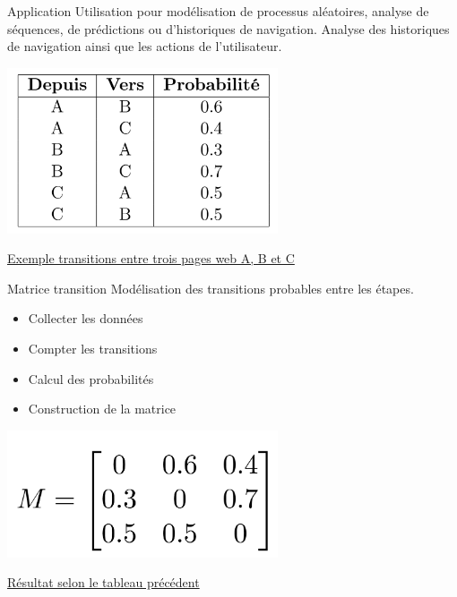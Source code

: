 \begin{frame}{Application}
	\vspace*{-0.3cm}
	Utilisation pour modélisation de processus aléatoires, analyse de séquences, de prédictions ou d'historiques de navigation.
	Analyse des historiques de navigation ainsi que les actions de l'utilisateur.

	\begin{center}
		\includegraphics[width=0.6\textwidth]{images/tableau_proba_markov.png}
        \par
		\uline{Exemple transitions entre trois pages web A, B et C}
	\end{center}
\end{frame}

\begin{frame}{Matrice transition}
	Modélisation des transitions probables entre les étapes.
	\begin{itemize}
		\item Collecter les données
		\item Compter les transitions
		\item Calcul des probabilités
		\item Construction de la matrice
	\end{itemize}
	\begin{center}
		\includegraphics[width=0.6\textwidth]{images/matrice_transition.png}
		\par 
        \uline{Résultat selon le tableau précédent}
	\end{center}
\end{frame}

